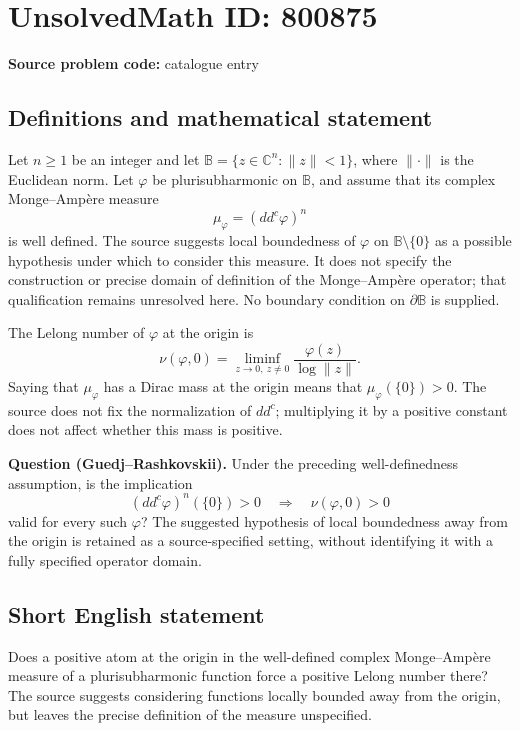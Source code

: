 \documentclass[11pt]{article}
\newcommand{\C}{\mathbb{C}}
\begin{document}
\section*{UnsolvedMath ID: 800875}
\textbf{Source problem code:} catalogue entry
\subsection{Definitions and mathematical statement}
Let \(n\geq 1\) be an integer and let \(\mathbb B=\{z\in\C^n:\|z\|<1\}\), where \(\|\cdot\|\) is the Euclidean norm. Let \(\varphi\) be plurisubharmonic on \(\mathbb B\), and assume that its complex Monge--Amp\`ere measure
\[
\mu_\varphi=(dd^c\varphi)^n
\]
is well defined. The source suggests local boundedness of \(\varphi\) on \(\mathbb B\setminus\{0\}\) as a possible hypothesis under which to consider this measure. It does not specify the construction or precise domain of definition of the Monge--Amp\`ere operator; that qualification remains unresolved here. No boundary condition on \(\partial\mathbb B\) is supplied.

The Lelong number of \(\varphi\) at the origin is
\[
\nu(\varphi,0)=\liminf_{z\to0,\ z\ne0}\frac{\varphi(z)}{\log\|z\|}.
\]
Saying that \(\mu_\varphi\) has a Dirac mass at the origin means that \(\mu_\varphi(\{0\})>0\). The source does not fix the normalization of \(dd^c\); multiplying it by a positive constant does not affect whether this mass is positive.

\textbf{Question (Guedj--Rashkovskii).} Under the preceding well-definedness assumption, is the implication
\[
(dd^c\varphi)^n(\{0\})>0
\quad\Longrightarrow\quad
\nu(\varphi,0)>0
\]
valid for every such \(\varphi\)? The suggested hypothesis of local boundedness away from the origin is retained as a source-specified setting, without identifying it with a fully specified operator domain.
\subsection{Short English statement}
Does a positive atom at the origin in the well-defined complex Monge--Amp\`ere measure of a plurisubharmonic function force a positive Lelong number there? The source suggests considering functions locally bounded away from the origin, but leaves the precise definition of the measure unspecified.
\end{document}

